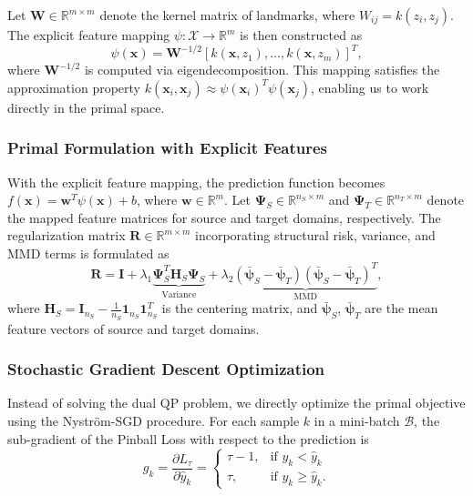 \documentclass[a4paper]{cas-sc}
\begin{document}
Let $\boldsymbol{W} \in \mathbb{R}^{m \times m}$ denote the kernel matrix of landmarks, where $W_{ij} = k(z_i, z_j)$. The explicit feature mapping $\psi: \mathcal{X} \to \mathbb{R}^m$ is then constructed as
\begin{equation}
\label{eq:nystrom_feature}
\psi(\boldsymbol{x}) = \boldsymbol{W}^{-1/2} [k(\boldsymbol{x}, z_1), \ldots, k(\boldsymbol{x}, z_m)]^T,
\end{equation}
where $\boldsymbol{W}^{-1/2}$ is computed via eigendecomposition. This mapping satisfies the approximation property $k(\boldsymbol{x}_i, \boldsymbol{x}_j) \approx \psi(\boldsymbol{x}_i)^T \psi(\boldsymbol{x}_j)$, enabling us to work directly in the primal space.

\subsubsection{Primal Formulation with Explicit Features}
With the explicit feature mapping, the prediction function becomes $f(\boldsymbol{x}) = \boldsymbol{w}^T \psi(\boldsymbol{x}) + b$, where $\boldsymbol{w} \in \mathbb{R}^m$. Let $\boldsymbol{\Psi}_S \in \mathbb{R}^{n_S \times m}$ and $\boldsymbol{\Psi}_T \in \mathbb{R}^{n_T \times m}$ denote the mapped feature matrices for source and target domains, respectively. The regularization matrix $\boldsymbol{R} \in \mathbb{R}^{m \times m}$ incorporating structural risk, variance, and MMD terms is formulated as
\begin{equation}
\label{eq:reg_matrix}
\boldsymbol{R} = \boldsymbol{I} + \lambda_1 \underbrace{\boldsymbol{\Psi}_S^T \boldsymbol{H}_S \boldsymbol{\Psi}_S}_{\text{Variance}} + \lambda_2 \underbrace{(\bar{\boldsymbol{\psi}}_S - \bar{\boldsymbol{\psi}}_T)(\bar{\boldsymbol{\psi}}_S - \bar{\boldsymbol{\psi}}_T)^T}_{\text{MMD}},
\end{equation}
where $\boldsymbol{H}_S = \boldsymbol{I}_{n_S} - \frac{1}{n_S} \boldsymbol{1}_{n_S} \boldsymbol{1}_{n_S}^T$ is the centering matrix, and $\bar{\boldsymbol{\psi}}_S$, $\bar{\boldsymbol{\psi}}_T$ are the mean feature vectors of source and target domains.

\subsubsection{Stochastic Gradient Descent Optimization}
Instead of solving the dual QP problem, we directly optimize the primal objective using the Nystr\"{o}m-SGD procedure. For each sample $k$ in a mini-batch $\mathcal{B}$, the sub-gradient of the Pinball Loss with respect to the prediction is
\begin{equation}
\label{eq:subgradient}
g_k = \frac{\partial L_{\tau}}{\partial \hat{y}_k} = \begin{cases} 
\tau - 1, & \text{if } y_k < \hat{y}_k \\ 
\tau, & \text{if } y_k \ge \hat{y}_k.
\end{cases}
\end{equation}
\end{document}
